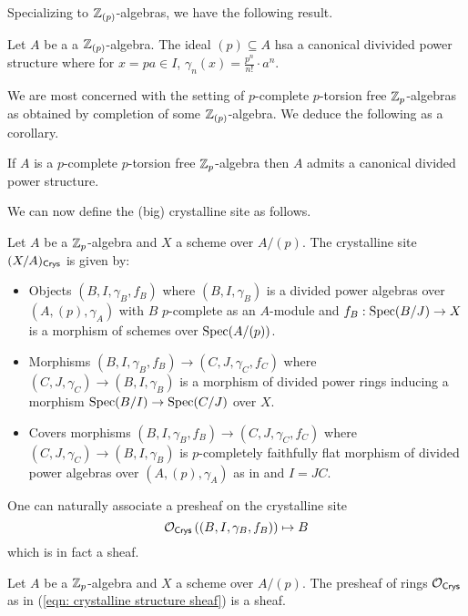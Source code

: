 Specializing to $\mathbb{Z}_{(p)}$-algebras, we have the following result. 
\begin{lemma}\label{lem: canonical PD structure on p-local algebras}
    Let $A$ be a a $\mathbb{Z}_{(p)}$-algebra. The ideal $(p)\subseteq A$ hsa a canonical divivided power structure where for $x=pa\in I$, $\gamma_{n}(x)=\frac{p^{n}}{n!}\cdot a^{n}$. 
\end{lemma}
We are most concerned with the setting of $p$-complete $p$-torsion free $\mathbb{Z}_{p}$-algebras as obtained by completion of some $\mathbb{Z}_{(p)}$-algebra. We deduce the following as a corollary. 
\begin{corollary}\label{corr: PD structure on complete torsion free p-adic algebras}
    If $A$ is a $p$-complete $p$-torsion free $\mathbb{Z}_{p}$-algebra then $A$ admits a canonical divided power structure. 
\end{corollary}
We can now define the (big) crystalline site as follows. 
\begin{definition}\label{def: crystalline site}
    Let $A$ be a $\mathbb{Z}_{p}$-algebra and $X$ a scheme over $A/(p)$. The crystalline site $(X/A)_{\mathsf{Crys}}$ is given by:
    \begin{itemize}
        \item Objects $(B,I,\gamma_{B},f_{B})$ where $(B,I,\gamma_{B})$ is a divided power algebras over $(A,(p),\gamma_{A})$ with $B$ $p$-complete as an $A$-module and $f_{B}:\operatorname{Spec}(B/J)\to X$ is a morphism of schemes over $\operatorname{Spec}(A/(p))$. 
        \item Morphisms $(B,I,\gamma_{B},f_{B})\to(C,J,\gamma_{C},f_{C})$ where $(C,J,\gamma_{C})\to(B,I,\gamma_{B})$ is a morphism of divided power rings inducing a morphism $\operatorname{Spec}(B/I)\to\operatorname{Spec}(C/J)$ over $X$. 
        \item Covers morphisms $(B,I,\gamma_{B},f_{B})\to(C,J,\gamma_{C},f_{C})$ where $(C,J,\gamma_{C})\to(B,I,\gamma_{B})$ is $p$-completely faithfully flat morphism of divided power algebras over $(A,(p),\gamma_{A})$ as in  and $I=JC$. 
    \end{itemize} 
\end{definition}
One can naturally associate a presheaf on the crystalline site 
\begin{equation}\label{eqn: crystalline structure sheaf}
    \mathcal{O}_{\mathsf{Crys}}\left((B,I,\gamma_{B},f_{B})\right)\mapsto B
\end{equation}
which is in fact a sheaf. 
\begin{proposition}\label{prop: crystalline presheaf is a sheaf}
    Let $A$ be a $\mathbb{Z}_{p}$-algebra and $X$ a scheme over $A/(p)$. The presheaf of rings $\mathcal{O}_{\mathsf{Crys}}$ as in (\ref{eqn: crystalline structure sheaf}) is a sheaf. 
\end{proposition}
